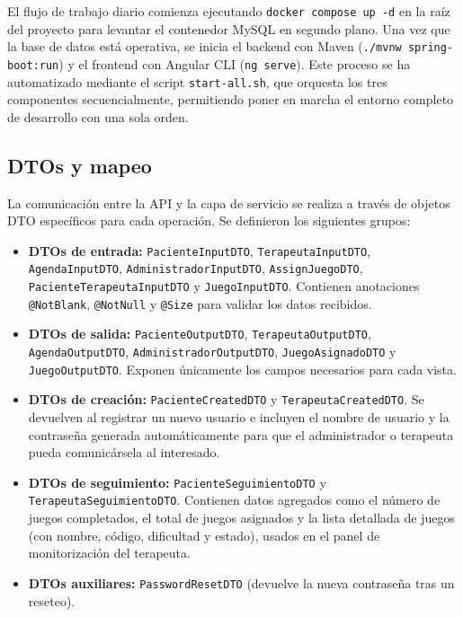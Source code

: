 El flujo de trabajo diario comienza ejecutando \texttt{docker compose up -d} en la raíz del proyecto para levantar el contenedor MySQL en segundo plano. Una vez que la base de datos está operativa, se inicia el backend con Maven (\texttt{./mvnw spring-boot:run}) y el frontend con Angular CLI (\texttt{ng serve}). Este proceso se ha automatizado mediante el script \texttt{start-all.sh}, que orquesta los tres componentes secuencialmente, permitiendo poner en marcha el entorno completo de desarrollo con una sola orden.

\subsection{DTOs y mapeo}
La comunicación entre la API y la capa de servicio se realiza a través de objetos DTO específicos para cada operación. Se definieron los siguientes grupos:

\begin{itemize}
    \item \textbf{DTOs de entrada:} \texttt{PacienteInputDTO}, \texttt{TerapeutaInputDTO}, \texttt{AgendaInputDTO}, \texttt{AdministradorInputDTO}, \texttt{AssignJuegoDTO}, \texttt{PacienteTerapeutaInputDTO} y \texttt{JuegoInputDTO}. Contienen anotaciones \texttt{@NotBlank}, \texttt{@NotNull} y \texttt{@Size} para validar los datos recibidos.
    \item \textbf{DTOs de salida:} \texttt{PacienteOutputDTO}, \texttt{TerapeutaOutputDTO}, \texttt{AgendaOutputDTO}, \texttt{AdministradorOutputDTO}, \texttt{JuegoAsignadoDTO} y \texttt{JuegoOutputDTO}. Exponen únicamente los campos necesarios para cada vista.
    \item \textbf{DTOs de creación:} \texttt{PacienteCreatedDTO} y \texttt{TerapeutaCreatedDTO}. Se devuelven al registrar un nuevo usuario e incluyen el nombre de usuario y la contraseña generada automáticamente para que el administrador o terapeuta pueda comunicársela al interesado.
    \item \textbf{DTOs de seguimiento:} \texttt{PacienteSeguimientoDTO} y \texttt{TerapeutaSeguimientoDTO}. Contienen datos agregados como el número de juegos completados, el total de juegos asignados y la lista detallada de juegos (con nombre, código, dificultad y estado), usados en el panel de monitorización del terapeuta.
    \item \textbf{DTOs auxiliares:} \texttt{PasswordResetDTO} (devuelve la nueva contraseña tras un reseteo).
\end{itemize}


